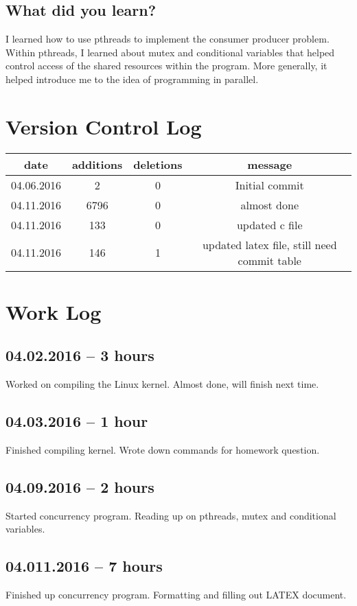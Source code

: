 \documentclass[letterpaper,
10pt, titlepage, draftclsnofoot, onecolumn]{IEEEtran}
\begin{document}
\subsection*{What did you learn?}

I learned how to use pthreads to implement the consumer producer problem. Within pthreads, I learned about mutex and conditional variables that helped control access of the shared resources within the program. More generally, it helped introduce me to the idea of programming in parallel.

\section*{Version Control Log}
\begin{tabular}{|c c c c |}
\hline
date & additions & deletions & message\\
\hline
04.06.2016 & 2 & 0 & Initial commit\\
\hline
04.11.2016 & 6796 & 0 & almost done\\
\hline
04.11.2016 & 133 & 0 & updated c file\\
\hline
04.11.2016 & 146 & 1 & updated latex file, still need commit table\\
\hline
\end{tabular}

\section*{Work Log}
\subsection*{04.02.2016 -- 3 hours}
Worked on compiling the Linux kernel. Almost done, will finish next time.
\subsection*{04.03.2016 -- 1 hour}
Finished compiling kernel. Wrote down commands for homework question.
\subsection*{04.09.2016 -- 2 hours}
Started concurrency program. Reading up on pthreads, mutex and conditional variables.
\subsection*{04.011.2016 -- 7 hours}
Finished up concurrency program. Formatting and filling out LATEX document.
\end{document}
